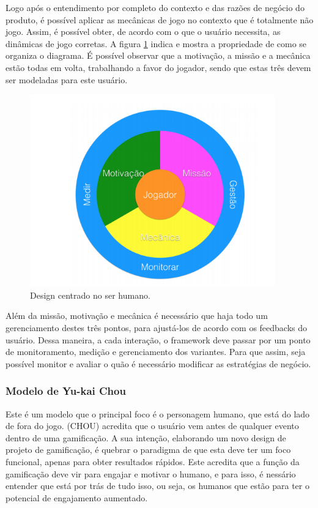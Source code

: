 Logo após o entendimento por completo do contexto e das razões de negócio do
produto, é possível aplicar as mecânicas de jogo no contexto que é totalmente
não jogo. Assim, é possível obter, de acordo com o que o usuário necessita, as
dinâmicas de jogo corretas. A figura \ref{fig:Kumar} indica e mostra a propriedade de
como se organiza o diagrama. É possível observar que a motivação, a missão e a
mecânica estão todas em volta, trabalhando a favor do jogador, sendo que estas
três devem ser modeladas para este usuário.

\begin{figure}[h]
    \centering
    \includegraphics[width=400px, scale=1]{figuras/kumar}
    \caption{ Design centrado no ser humano.}
    \label{fig:Kumar}
\end{figure}

Além da missão, motivação e mecânica é necessário que haja todo um gerenciamento
destes três pontos, para ajustá-los de acordo com os feedbacks do usuário. Dessa
maneira, a cada interação, o framework deve passar por um ponto de monitoramento,
medição e gerenciamento dos variantes. Para que assim, seja possível monitor e
avaliar o quão é necessário modificar as estratégias de negócio.

\subsubsection{Modelo de Yu-kai Chou}
\label{sub:modelodeyu-kaichou}
Este é um modelo que o principal foco é o personagem humano, que está do lado
de fora do jogo. (CHOU) acredita que o usuário vem antes de qualquer evento
dentro de uma gamificação. A sua intenção, elaborando um novo design de projeto
de gamificação, é quebrar o paradigma de que esta deve ter um foco funcional,
apenas para obter resultados rápidos. Este acredita que a função da gamificação
deve vir para engajar e motivar o humano, e para isso, é nessário entender
que está por trás de tudo isso, ou seja, os humanos que estão para ter o
potencial de engajamento aumentado.

